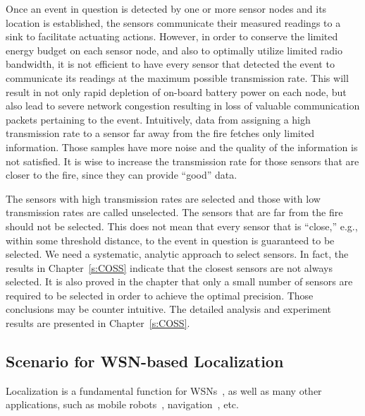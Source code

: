     Once an event in question is detected by one or more sensor
nodes and its location is established, the sensors communicate
their measured readings to a sink to facilitate actuating actions.
However, in order to conserve the limited energy budget on
each sensor node, and also to optimally utilize limited radio
bandwidth, it is not efficient to have every sensor that detected
the event to communicate its readings at the maximum possible
transmission rate. This will result in not only rapid depletion of
on-board battery power on each node, but also lead to severe
network congestion resulting in loss of valuable communication packets pertaining to the event. Intuitively, data from assigning
a high transmission rate to a sensor far away from the
fire fetches only limited information. Those samples have more noise and the quality of the information is not satisfied. It
is wise to increase the transmission rate for those sensors that
are closer to the fire, since they can provide ``good'' data.


     The sensors with high transmission rates are selected and those with low transmission rates are called unselected.
The sensors that are far from the fire should not be selected. This does not mean that every sensor
that is ``close,'' e.g., within some threshold distance, to the
event in question is guaranteed to be selected. We need a
systematic, analytic approach to select sensors. In fact, the results in Chapter~\ref{s:COSS} indicate that the closest sensors are not always selected. It is also proved in the chapter that only a small number of sensors are required to be selected in order to achieve the optimal precision. Those conclusions may be counter intuitive. The detailed analysis and experiment results are presented in Chapter~\ref{s:COSS}.



\subsection{Scenario for WSN-based Localization}
Localization is a fundamental function for WSNs~\cite{NicuLocalAdHoc}, as well as many other applications, such as mobile robots~\cite{Borenstein96WhereAmIWeb,Thrun00e}, navigation~\cite{CheungLSTOA04}, etc.


